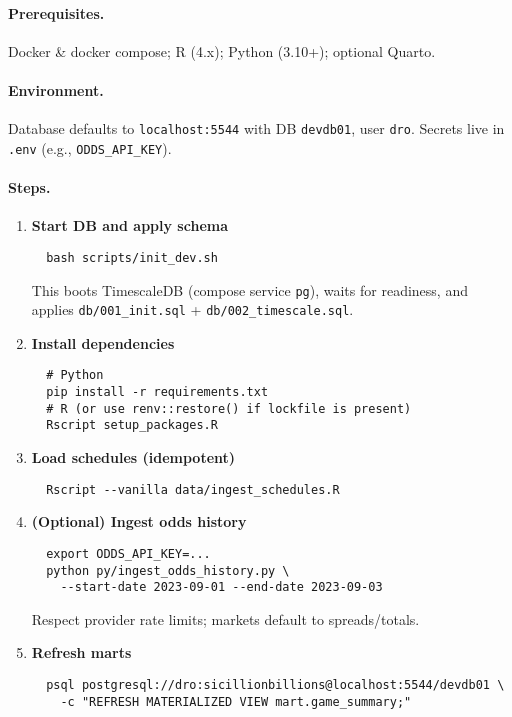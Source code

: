 \paragraph{Prerequisites.} Docker \& docker compose; R (4.x); Python (3.10+); optional Quarto.
\paragraph{Environment.} Database defaults to \texttt{localhost:5544} with DB \texttt{devdb01}, user \texttt{dro}. Secrets live in \texttt{.env} (e.g., \texttt{ODDS\_API\_KEY}).
\paragraph{Steps.}
\begin{enumerate}
  \item \textbf{Start DB and apply schema}
  \begin{verbatim}
  bash scripts/init_dev.sh
  \end{verbatim}
  This boots TimescaleDB (compose service \texttt{pg}), waits for readiness, and applies \texttt{db/001\_init.sql} + \texttt{db/002\_timescale.sql}.

  \item \textbf{Install dependencies}
  \begin{verbatim}
  # Python
  pip install -r requirements.txt
  # R (or use renv::restore() if lockfile is present)
  Rscript setup_packages.R
  \end{verbatim}

  \item \textbf{Load schedules (idempotent)}
  \begin{verbatim}
  Rscript --vanilla data/ingest_schedules.R
  \end{verbatim}

  \item \textbf{(Optional) Ingest odds history}
  \begin{verbatim}
  export ODDS_API_KEY=...
  python py/ingest_odds_history.py \
    --start-date 2023-09-01 --end-date 2023-09-03
  \end{verbatim}
  Respect provider rate limits; markets default to spreads/totals.

  \item \textbf{Refresh marts}
  \begin{verbatim}
  psql postgresql://dro:sicillionbillions@localhost:5544/devdb01 \
    -c "REFRESH MATERIALIZED VIEW mart.game_summary;"
  \end{verbatim}


\end{enumerate}
